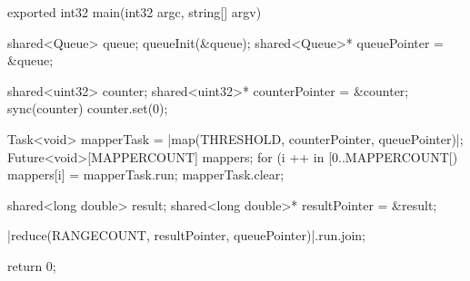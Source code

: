 \begin{ccode}
exported int32 main(int32 argc, string[] argv) { 
  shared<Queue> queue; 
  queueInit(&queue); 
  shared<Queue>* queuePointer = &queue; 
   
  shared<uint32> counter; 
  shared<uint32>* counterPointer = &counter; 
  sync(counter) { counter.set(0); } 

  Task<void> mapperTask = |map(THRESHOLD, counterPointer, queuePointer)|; 
  Future<void>[MAPPERCOUNT] mappers; 
  for (i ++ in [0..MAPPERCOUNT[) { 
    mappers[i] = mapperTask.run; 
  }
  mapperTask.clear;
   
  shared<long double> result; 
  shared<long double>* resultPointer = &result; 
   
  |reduce(RANGECOUNT, resultPointer, queuePointer)|.run.join;
  
  return 0; 
}
\end{ccode}

